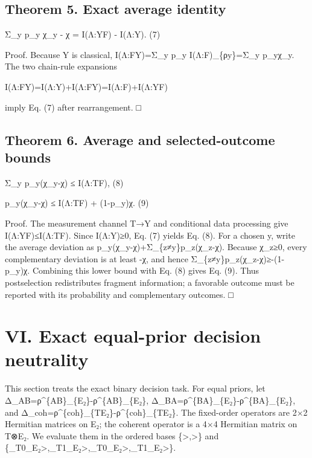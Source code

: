 \documentclass[
]{article}
\begin{document}
\subsection{Theorem 5. Exact average
identity}\label{theorem-5.-exact-average-identity}

Σ\_y p\_y χ\_y - χ = I(Λ:Y\textbar F) - I(Λ:Y). (7)

Proof. Because Y is classical, I(Λ:F\textbar Y)=Σ\_y p\_y
I(Λ:F)\_\{ρ\textbar y\}=Σ\_y p\_yχ\_y. The two chain-rule expansions

I(Λ:FY)=I(Λ:Y)+I(Λ:F\textbar Y)=I(Λ:F)+I(Λ:Y\textbar F)

imply Eq. (7) after rearrangement. □

\subsection{Theorem 6. Average and selected-outcome
bounds}\label{theorem-6.-average-and-selected-outcome-bounds}

Σ\_y p\_y(χ\_y-χ) ≤ I(Λ:T\textbar F), (8)

p\_y(χ\_y-χ) ≤ I(Λ:T\textbar F) + (1-p\_y)χ. (9)

Proof. The measurement channel T→Y and conditional data processing give
I(Λ:Y\textbar F)≤I(Λ:T\textbar F). Since I(Λ:Y)≥0, Eq. (7) yields Eq.
(8). For a chosen y, write the average deviation as
p\_y(χ\_y-χ)+Σ\_\{z≠y\}p\_z(χ\_z-χ). Because χ\_z≥0, every complementary
deviation is at least -χ, and hence Σ\_\{z≠y\}p\_z(χ\_z-χ)≥-(1-p\_y)χ.
Combining this lower bound with Eq. (8) gives Eq. (9). Thus
postselection redistributes fragment information; a favorable outcome
must be reported with its probability and complementary outcomes. □

\section{VI. Exact equal-prior decision
neutrality}\label{vi.-exact-equal-prior-decision-neutrality}

This section treats the exact binary decision task. For equal priors,
let Δ\_AB=ρ\^{}\{AB\}\_\{E₂\}-ρ\^{}\{AB\}\_\{E₂\},
Δ\_BA=ρ\^{}\{BA\}\_\{E₂\}-ρ\^{}\{BA\}\_\{E₂\}, and
Δ\_coh=ρ\^{}\{coh\}\_\{TE₂\}-ρ\^{}\{coh\}\_\{TE₂\}.
The fixed-order operators are 2×2 Hermitian matrices on E₂; the coherent
operator is a 4×4 Hermitian matrix on T⊗E₂. We evaluate them in the
ordered bases \{\textgreater,\textgreater\} and
\{\_T0\_E₂\textgreater,\_T1\_E₂\textgreater,\_T0\_E₂\textgreater,\_T1\_E₂\textgreater\}.
\end{document}
